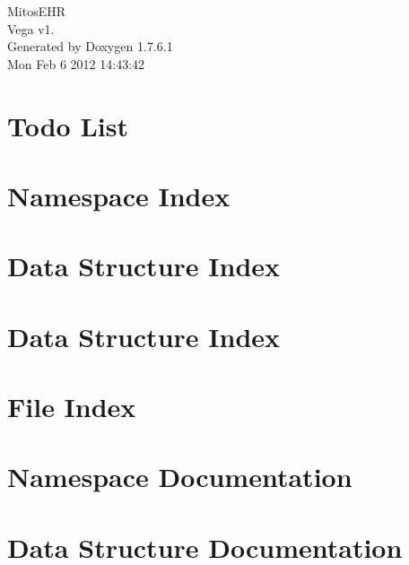 \documentclass[a4paper]{book}
\begin{document}
\hypersetup{pageanchor=false,citecolor=blue}
\begin{titlepage}
\vspace*{7cm}
\begin{center}
{\Large \-Mitos\-E\-H\-R \\[1ex]\large \-Vega v1. }\\
\vspace*{1cm}
{\large \-Generated by Doxygen 1.7.6.1}\\
\vspace*{0.5cm}
{\small Mon Feb 6 2012 14:43:42}\\
\end{center}
\end{titlepage}
\clearemptydoublepage
{}
\tableofcontents
\clearemptydoublepage
{}
\hypersetup{pageanchor=true,citecolor=blue}
\chapter{\-Todo \-List}
\label{todo}
\hypertarget{todo}{}

\chapter{\-Namespace \-Index}

\chapter{\-Data \-Structure \-Index}

\chapter{\-Data \-Structure \-Index}

\chapter{\-File \-Index}

\chapter{\-Namespace \-Documentation}

\chapter{\-Data \-Structure \-Documentation}























\end{document}
